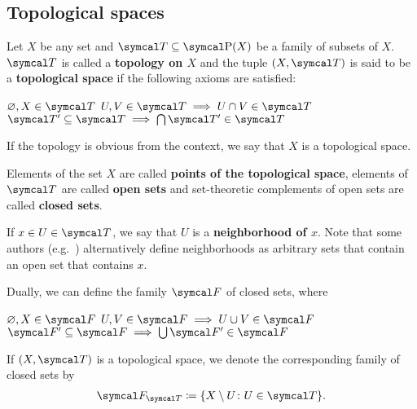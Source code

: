 \subsection{Topological spaces}\label{sec:topological_spaces}

\begin{definition}\label{def:topological_space}\cite[11]{Engelking1989}
  Let \( X \) be any set and \( \Cal{T} \subseteq \Power(X) \) be a family of subsets of \( X \). \( \Cal{T} \) is called a \textbf{topology on \( X \)} and the tuple \( (X, \Cal{T}) \) is said to be a \textbf{topological space} if the following axioms are satisfied:
  \begin{description}
     \( \varnothing, X \in \Cal{T} \)
     \( U, V \in \Cal{T} \implies U \cap V \in \Cal{T} \)
     \( \Cal{T}' \subseteq \Cal{T} \implies \bigcap \Cal{T}' \in \Cal{T} \)
  \end{description}

  If the topology is obvious from the context, we say that \( X \) is a topological space.

  Elements of the set \( X \) are called \textbf{points of the topological space}, elements of \( \Cal{T} \) are called \textbf{open sets} and set-theoretic complements of open sets are called \textbf{closed sets}.

  If \( x \in U \in \Cal{T} \), we say that \( U \) is a \textbf{neighborhood of \( x \)}. Note that some authors (e.g.~\cite[38]{Kelley1955}) alternatively define neighborhoods as arbitrary sets that contain an open set that contains \( x \).

  Dually, we can define the family \( \Cal{F} \) of closed sets, where
  \begin{description}
     \( \varnothing, X \in \Cal{F} \)
     \( U, V \in \Cal{F} \implies U \cup V \in \Cal{F} \)
     \( \Cal{F}' \subseteq \Cal{F} \implies \bigcup \Cal{F}' \in \Cal{F} \)
  \end{description}

  If \( (X, \Cal{T}) \) is a topological space, we denote the corresponding family of closed sets by
  \begin{align*}
    \Cal{F}_{\Cal{T}} \coloneqq \{ X \setminus U \colon U \in \Cal{T} \}.
  \end{align*}
\end{definition}

